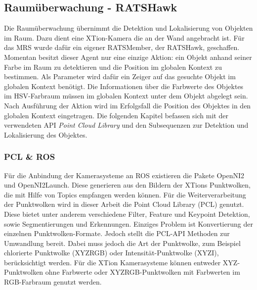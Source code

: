 \subsection{Raumüberwachung - RATSHawk}
Die Raumüberwachung übernimmt die Detektion und Lokalisierung von Objekten im Raum. Dazu dient eine XTion-Kamera die an der Wand angebracht ist. Für das MRS wurde dafür ein eigener RATSMember, der RATSHawk, geschaffen. Momentan besitzt dieser Agent nur eine einzige Aktion: ein Objekt anhand seiner Farbe im Raum zu detektieren und die Position im globalen Kontext zu bestimmen. Als Parameter wird dafür ein Zeiger auf das gesuchte Objekt im globalen Kontext benötigt. Die Informationen über die Farbwerte des Objektes im HSV-Farbraum müssen im globalen Kontext unter dem Objekt abgelegt sein. Nach Ausführung der Aktion wird im Erfolgsfall die Position des Objektes in den globalen Kontext eingetragen. Die folgenden Kapitel befassen sich mit der verwendeten API \textit{Point Cloud Library} und den Subsequenzen zur Detektion und Lokalisierung des Objektes.

\subsubsection{PCL \& ROS}
Für die Anbindung der Kamerasysteme an ROS existieren die Pakete OpenNI2 und OpenNI2Launch. Diese generieren aus den Bildern der XTions Punktwolken, die mit Hilfe von Topics empfangen werden können. Für die Weiterverarbeitung der Punktwolken wird in dieser Arbeit die Point Cloud Library (PCL) genutzt. Diese bietet unter anderem verschiedene Filter, Feature und Keypoint Detektion, sowie Segmentierungen und Erkennungen. Einziges Problem ist Konvertierung der einzelnen Punktwolken-Formate. Jedoch stellt die PCL-API Methoden zur Umwandlung bereit. Dabei muss jedoch die Art der Punktwolke, zum Beispiel chlorierte Punktwolke (XYZRGB) oder Intensität-Punktwolke (XYZI), berücksichtigt werden. Für die XTion Kamerasysteme können entweder XYZ-Punktwolken ohne Farbwerte oder XYZRGB-Punktwolken mit Farbwerten im RGB-Farbraum genutzt werden.

